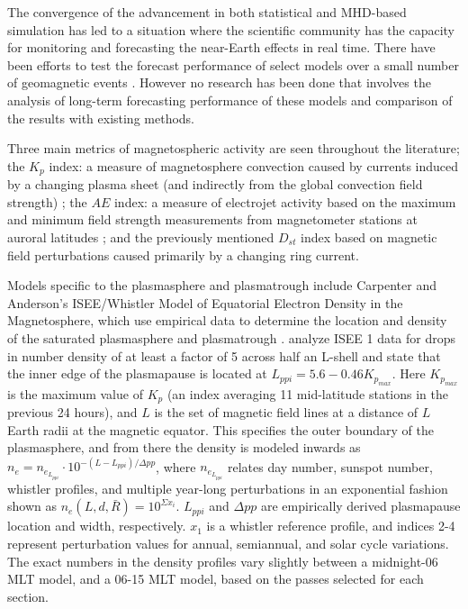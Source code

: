 The convergence of the advancement in both statistical and MHD-based simulation has led to a situation where the scientific community has the capacity for monitoring and forecasting the near-Earth effects in real time.  There have been efforts to test the forecast performance of select models over a small number of geomagnetic events \citep{ANNforecast,StormModel,StatCompStorms,Yermolaev} . However no research has been done that involves the analysis of long-term forecasting performance of these models and comparison of the results with existing methods.

Three main metrics of magnetospheric activity are seen throughout the literature; the $K_p$ index: a measure of magnetosphere convection caused by currents induced by a changing plasma sheet (and indirectly from the global convection field strength) \citep{Thomsen2004WhyKpSoGood}; the $AE$ index: a measure of electrojet activity based on the maximum and minimum field strength measurements from magnetometer stations at auroral latitudes \citep{DavisSugiura1966AE}; and the previously mentioned $D_{st}$ index based on magnetic field perturbations caused primarily by a changing ring current.

Models specific to the plasmasphere and plasmatrough include Carpenter and Anderson's ISEE/Whistler Model of Equatorial Electron Density in the Magnetosphere, which use empirical data to determine the location and density of the saturated plasmasphere and plasmatrough \citep{Carpenter1992ISEEModel}. \cite{Carpenter1992ISEEModel} analyze ISEE 1 data for drops in number density of at least a factor of 5 across half an L-shell and state that the inner edge of the plasmapause is located at $L_{ppi}=5.6-0.46K_{p_{max}}$. Here $K_{p_{max}}$ is the maximum value of $K_p$ (an index averaging 11 mid-latitude stations in the previous 24 hours), and $L$ is the set of magnetic field lines at a distance of $L$ Earth radii at the magnetic equator. This specifies the outer boundary of the plasmasphere, and from there the density is modeled inwards as $n_e=n_{e_{L_{ppi}}}\cdot 10^{-(L-L_{ppi})/\Delta pp}$, where $n_{e_{L_{ppi}}}$ relates day number, sunspot number, whistler profiles, and multiple year-long perturbations in an exponential fashion shown as $n_e(L,d,\bar{R})=10^{\Sigma x_i}$. $L_{ppi}$ and $\Delta pp$ are empirically derived plasmapause location and width, respectively. $x_1$ is a whistler reference profile, and indices 2-4 represent perturbation values for annual, semiannual, and solar cycle variations. The exact numbers in the density profiles vary slightly between a midnight-06 MLT model, and a 06-15 MLT model, based on the passes selected for each section. 

